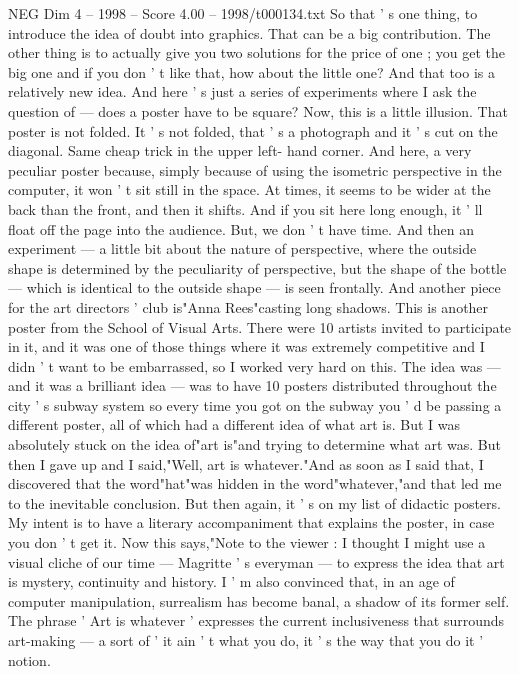 \begin{textsample}{NEG Dim 4 – 1998 – Score 4.00 – 1998/t000134.txt}
So that ' s one thing, to introduce the idea of doubt into graphics.
That can be a big contribution.
The other thing is to actually give you two solutions for the price of one ; you get the big one and if you don ' t like that, how about the little one?
And that too is a relatively new idea.
And here ' s just a series of experiments where I ask the question of — does a poster have to be square?
Now, this is a little illusion.
That poster is not folded.
It ' s not folded, that ' s a photograph and it ' s cut on the diagonal.
Same cheap trick in the upper left- hand corner.
And here, a very peculiar poster because, simply because of using the isometric perspective in the computer, it won ' t sit still in the space.
At times, it seems to be wider at the back than the front, and then it shifts.
And if you sit here long enough, it ' ll float off the page into the audience.
But, we don ' t have time.
And then an experiment — a little bit about the nature of perspective, where the outside shape is determined by the peculiarity of perspective, but the shape of the bottle — which is identical to the outside shape — is seen frontally.
And another piece for the art directors ' club is"Anna Rees"casting long shadows.
This is another poster from the School of Visual Arts.
There were 10 artists invited to participate in it, and it was one of those things where it was extremely competitive and I didn ' t want to be embarrassed, so I worked very hard on this.
The idea was — and it was a brilliant idea — was to have 10 posters distributed throughout the city ' s subway system so every time you got on the subway you ' d be passing a different poster, all of which had a different idea of what art is.
But I was absolutely stuck on the idea of"art is"and trying to determine what art was.
But then I gave up and I said,"Well, art is whatever."And as soon as I said that, I discovered that the word"hat"was hidden in the word"whatever,"and that led me to the inevitable conclusion.
But then again, it ' s on my list of didactic posters.
My intent is to have a literary accompaniment that explains the poster, in case you don ' t get it.
Now this says,"Note to the viewer : I thought I might use a visual cliche of our time — Magritte ' s everyman — to express the idea that art is mystery, continuity and history.
I ' m also convinced that, in an age of computer manipulation, surrealism has become banal, a shadow of its former self.
The phrase ' Art is whatever ' expresses the current inclusiveness that surrounds art-making — a sort of ' it ain ' t what you do, it ' s the way that you do it ' notion.

\end{textsample}
